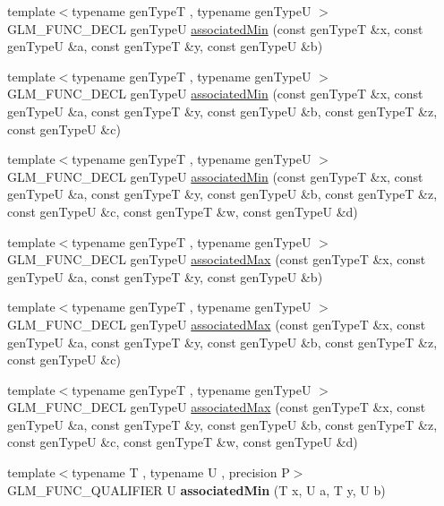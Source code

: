 \begin{DoxyCompactItemize}
\item 
{\footnotesize template$<$typename gen\-Type\-T , typename gen\-Type\-U $>$ }\\G\-L\-M\-\_\-\-F\-U\-N\-C\-\_\-\-D\-E\-C\-L gen\-Type\-U \hyperlink{group__gtx__associated__min__max_ga47bdb60409768f3d315bc5a1f739810a}{associated\-Min} (const gen\-Type\-T \&x, const gen\-Type\-U \&a, const gen\-Type\-T \&y, const gen\-Type\-U \&b)
\item 
{\footnotesize template$<$typename gen\-Type\-T , typename gen\-Type\-U $>$ }\\G\-L\-M\-\_\-\-F\-U\-N\-C\-\_\-\-D\-E\-C\-L gen\-Type\-U \hyperlink{group__gtx__associated__min__max_ga3f696c0cce55211f333edb7336cc9cb8}{associated\-Min} (const gen\-Type\-T \&x, const gen\-Type\-U \&a, const gen\-Type\-T \&y, const gen\-Type\-U \&b, const gen\-Type\-T \&z, const gen\-Type\-U \&c)
\item 
{\footnotesize template$<$typename gen\-Type\-T , typename gen\-Type\-U $>$ }\\G\-L\-M\-\_\-\-F\-U\-N\-C\-\_\-\-D\-E\-C\-L gen\-Type\-U \hyperlink{group__gtx__associated__min__max_ga45618e13844d00046a0fe3409ae7513e}{associated\-Min} (const gen\-Type\-T \&x, const gen\-Type\-U \&a, const gen\-Type\-T \&y, const gen\-Type\-U \&b, const gen\-Type\-T \&z, const gen\-Type\-U \&c, const gen\-Type\-T \&w, const gen\-Type\-U \&d)
\item 
{\footnotesize template$<$typename gen\-Type\-T , typename gen\-Type\-U $>$ }\\G\-L\-M\-\_\-\-F\-U\-N\-C\-\_\-\-D\-E\-C\-L gen\-Type\-U \hyperlink{group__gtx__associated__min__max_gaee554495240b93d80492b3d2312ede1d}{associated\-Max} (const gen\-Type\-T \&x, const gen\-Type\-U \&a, const gen\-Type\-T \&y, const gen\-Type\-U \&b)
\item 
{\footnotesize template$<$typename gen\-Type\-T , typename gen\-Type\-U $>$ }\\G\-L\-M\-\_\-\-F\-U\-N\-C\-\_\-\-D\-E\-C\-L gen\-Type\-U \hyperlink{group__gtx__associated__min__max_ga20218dcc769c76adf0c3e9aad21c64a4}{associated\-Max} (const gen\-Type\-T \&x, const gen\-Type\-U \&a, const gen\-Type\-T \&y, const gen\-Type\-U \&b, const gen\-Type\-T \&z, const gen\-Type\-U \&c)
\item 
{\footnotesize template$<$typename gen\-Type\-T , typename gen\-Type\-U $>$ }\\G\-L\-M\-\_\-\-F\-U\-N\-C\-\_\-\-D\-E\-C\-L gen\-Type\-U \hyperlink{group__gtx__associated__min__max_ga23f2bce9c1d6f775cd1f7bf36525286e}{associated\-Max} (const gen\-Type\-T \&x, const gen\-Type\-U \&a, const gen\-Type\-T \&y, const gen\-Type\-U \&b, const gen\-Type\-T \&z, const gen\-Type\-U \&c, const gen\-Type\-T \&w, const gen\-Type\-U \&d)
\item 
\hypertarget{namespaceglm_a8234240191a8aaecdf085f19d41abc5e}{{\footnotesize template$<$typename T , typename U , precision P$>$ }\\G\-L\-M\-\_\-\-F\-U\-N\-C\-\_\-\-Q\-U\-A\-L\-I\-F\-I\-E\-R U {\bfseries associated\-Min} (T x, U a, T y, U b)}\label{namespaceglm_a8234240191a8aaecdf085f19d41abc5e}


\end{DoxyCompactItemize}
